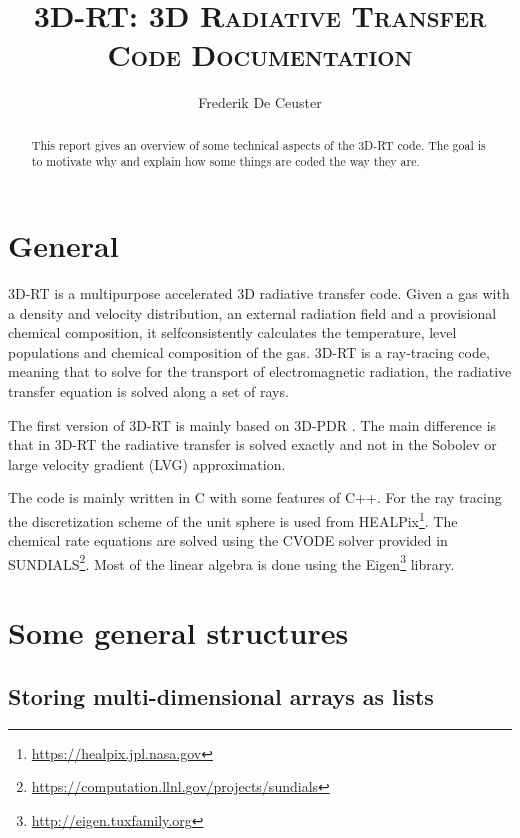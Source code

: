 \documentclass[]{article}
\title{\vspace{0cm} \huge \textsc{3D-RT: 3D Radiative Transfer} \\
                \vskip3mm \textsc{Code Documentation} }
\author{\large Frederik De Ceuster}
\date{}
\begin{document}
\maketitle

\vskip5cm

\begin{abstract}
This report gives an overview of some technical aspects of the 3D-RT code. The goal is to motivate why and explain how some things are coded the way they are.
\end{abstract}

\vskip5cm

\tableofcontents

\newpage


\section{General}

3D-RT is a multipurpose accelerated 3D radiative transfer code. Given a gas with a density and velocity distribution, an external radiation field and a provisional chemical composition, it selfconsistently calculates the temperature, level populations and chemical composition of the gas. 3D-RT is a ray-tracing code, meaning that to solve for the transport of electromagnetic radiation, the radiative transfer equation is solved along a set of rays.

\bigskip

The first version of 3D-RT is mainly based on 3D-PDR \cite{3DPDR}. The main difference is that in 3D-RT the radiative transfer is solved exactly and not in the Sobolev or large velocity gradient (LVG) approximation.

\bigskip

The code is mainly written in C with some features of C++. For the ray tracing the discretization scheme of the unit sphere is used from HEALPix\footnote{\url{https://healpix.jpl.nasa.gov}}. The chemical rate equations are solved using the CVODE solver provided in SUNDIALS\footnote{\url{https://computation.llnl.gov/projects/sundials}}. Most of the linear algebra is done using the Eigen\footnote{\url{http://eigen.tuxfamily.org}} library.



\section{Some general structures}

\subsection{Storing multi-dimensional arrays as lists}
\end{document}
